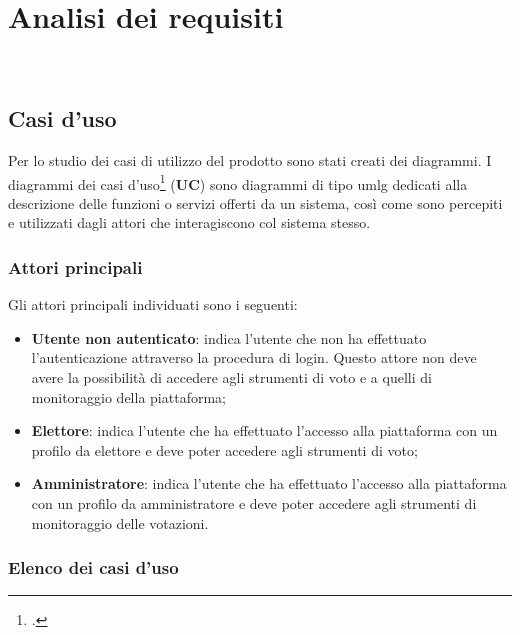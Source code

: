 
\chapter{Analisi dei requisiti}
\label{cap:analisi-requisiti}

\\

\section{Casi d'uso}

Per lo studio dei casi di utilizzo del prodotto sono stati creati dei diagrammi.
I diagrammi dei casi d'uso\footcite{site:UseCase} (\textbf{UC}) sono diagrammi di tipo \gls{umlg} dedicati alla descrizione delle funzioni o servizi offerti da un sistema, così come sono percepiti e utilizzati dagli attori che interagiscono col sistema stesso.

\subsection{Attori principali}
Gli attori principali individuati sono i seguenti:
\begin{itemize}
    \item \textbf{Utente non autenticato}: indica l'utente che non ha effettuato l'autenticazione attraverso la procedura di login. Questo attore non deve avere la possibilità di accedere agli strumenti di voto e a quelli di monitoraggio della piattaforma;
    \item \textbf{Elettore}: indica l'utente che ha effettuato l'accesso alla piattaforma con un profilo da elettore e deve poter accedere agli strumenti di voto;
    \item \textbf{Amministratore}: indica l'utente che ha effettuato l'accesso alla piattaforma con un profilo da amministratore e deve poter accedere agli strumenti di monitoraggio delle votazioni.
\end{itemize}

\subsection{Elenco dei casi d'uso}

